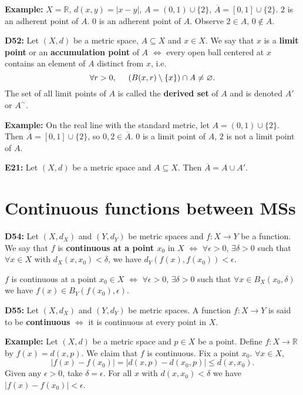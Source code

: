 \documentclass[twocolumn,10pt]{article}
\begin{document}
\color{red}
\textbf{Example:} $X=\mathbb{R}$, $d(x,y)=|x-y|$, $A=(0,1)\cup\{2\}$, $\overline{A}=[0,1]\cup\{2\}$. $2$ is an adherent point of $A$. $0$ is an adherent point of $A$. Observe $2\in A$, $0\not\in A$.
\color{black}

\textbf{D52:} Let $(X,d)$ be a metric space, $A\subseteq X$ and $x\in X$. We say that $x$ is a \textbf{limit point} or an \textbf{accumulation point} of $A$ $\Leftrightarrow$ every open ball centered at $x$ contains an element of $A$ distinct from $x$, i.e.
\begin{equation*}
    \forall r>0, \hspace{0.5cm} (B(x,r) \setminus \{x\}) \cap A \neq \varnothing.
\end{equation*}
The set of all limit points of $A$ is called the \textbf{derived set} of $A$ and is denoted $A'$ or $A^{\sim}$.

\color{red}
\textbf{Example:} On the real line with the standard metric, let $A=(0,1)\cup\{2\}$. Then $\overline{A}=[0,1]\cup\{2\}$, so $0,2\in\overline{A}$. $0$ is a limit point of $A$, $2$ is not a limit point of $A$.
\color{black}

\textbf{E21:} Let $(X,d)$ be a metric space and $A\subseteq X$. Then $\overline{A}=A\cup A'$.

\section{Continuous functions between MSs}

\textbf{D54:} Let $(X,d_X)$ and $(Y,d_Y)$ be metric spaces and $f:X\to Y$ be a function. We say that $f$ is \textbf{continuous at a point $x_0$} in $X$ $\Leftrightarrow$ $\forall\epsilon>0$, $\exists\delta>0$ such that $\forall x\in X$ with $d_X(x,x_0)<\delta$, we have $d_Y(f(x),f(x_0))<\epsilon$.

$f$ is continuous at a point $x_0\in X$ $\Leftrightarrow$ $\forall\epsilon>0$, $\exists\delta>0$ such that $\forall x\in B_X(x_0,\delta)$ we have $f(x)\in B_Y(f(x_0),\epsilon)$.

\textbf{D55:} Let $(X,d_X)$ and $(Y,d_Y)$ be metric spaces. A function $f:X\to Y$ is said to be \textbf{continuous} $\Leftrightarrow$ it is continuous at every point in $X$.

\color{red}
\textbf{Example:} Let $(X,d)$ be a metric space and $p\in X$ be a point. Define $f:X\to\mathbb{R}$ by $f(x)=d(x,p)$. We claim that $f$ is continuous. Fix a point $x_0$. $\forall x\in X$,
\begin{equation*}
    |f(x) - f(x_0)| = |d(x,p) - d(x_0,p)| \leq d(x,x_0).
\end{equation*}
Given any $\epsilon>0$, take $\delta=\epsilon$. For all $x$ with $d(x,x_0)<\delta$ we have $|f(x)-f(x_0)|<\epsilon$.
\color{black}
\end{document}
